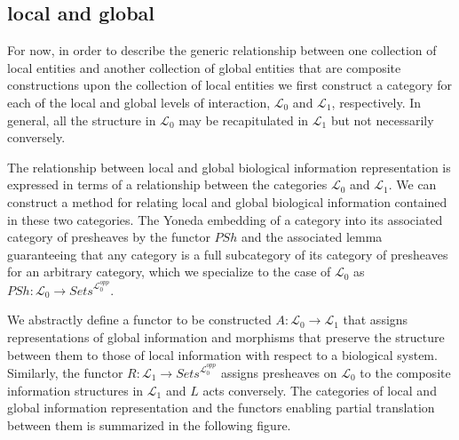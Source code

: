 \subsection{local and global}
\begin{frame}
For now, in order to describe the generic relationship between one collection of local entities and another collection of global entities that are composite constructions upon the collection of local entities we first construct a category for each of the local and global levels of interaction, $\mathcal{L}_0$ and $\mathcal{L}_1$, respectively. In general, all the structure in $\mathcal{L}_0$ may be recapitulated in $\mathcal{L}_1$ but not necessarily conversely.
\end{frame}

\begin{frame}
The relationship between local and global biological information representation is expressed in terms of a relationship between the categories $\mathcal{L}_0$ and $\mathcal{L}_1$. We can construct a method for relating local and global biological information contained in these two categories. The Yoneda embedding of a category into its associated category of presheaves by the functor $PSh$ and the associated lemma guaranteeing that any category is a full subcategory of its category of presheaves for an arbitrary category, which we specialize to the case of $\mathcal{L}_0$ as $PSh: \mathcal{L}_0 \rightarrow \textit{Sets}^{\mathcal{L}_0^{opp}}$.
\end{frame}

\begin{frame}
We abstractly define a functor to be constructed $A:\mathcal{L}_0 \rightarrow \mathcal{L}_1$ that assigns representations of global information and morphisms that preserve the structure between them to those of local information with respect to a biological system.  Similarly, the functor $R: \mathcal{L}_1 \rightarrow \textit{Sets}^{\mathcal{L}_0^{opp}}$ assigns presheaves on $\mathcal{L}_0$ to the composite information structures in $\mathcal{L}_1$ and $L$ acts conversely. The categories of local and global information representation and the functors enabling partial translation between them is summarized in the following figure.
\end{frame}

